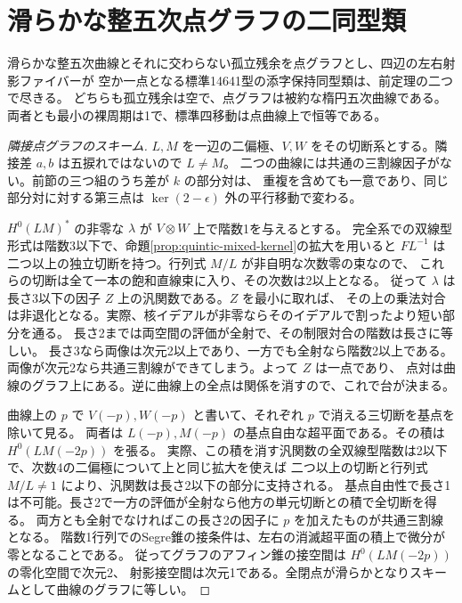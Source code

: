 \section{滑らかな整五次点グラフの二同型類}
\label{sec:elliptic-quintic-regularity}
\begin{theorem}\label{thm:elliptic-quintic-regularity}
滑らかな整五次曲線とそれに交わらない孤立残余を点グラフとし、四辺の左右射影ファイバーが
空か一点となる標準14641型の添字保持同型類は、前定理の二つで尽きる。
どちらも孤立残余は空で、点グラフは被約な楕円五次曲線である。
両者とも最小の裸周期は1で、標準四移動は点曲線上で恒等である。
\end{theorem}
\begin{proof}[隣接点グラフのスキーム]
$L,M$ を一辺の二偏極、$V,W$ をその切断系とする。隣接差 $a,b$ は五捩れではないので $L\ne M$。
二つの曲線には共通の三割線因子がない。前節の三つ組のうち差が $k$ の部分対は、
重複を含めても一意であり、同じ部分対に対する第三点は $\ker(2-\epsilon)$ 外の平行移動で変わる。

$H^0(LM)^*$ の非零な $\lambda$ が $V\otimes W$ 上で階数1を与えるとする。
完全系での双線型形式は階数3以下で、命題\ref{prop:quintic-mixed-kernel}の拡大を用いると
$F L^{-1}$ は二つ以上の独立切断を持つ。行列式 $M/L$ が非自明な次数零の束なので、
これらの切断は全て一本の飽和直線束に入り、その次数は2以上となる。
従って $\lambda$ は長さ3以下の因子 $Z$ 上の汎関数である。$Z$ を最小に取れば、
その上の乗法対合は非退化となる。実際、核イデアルが非零ならそのイデアルで割ったより短い部分を通る。
長さ2までは両空間の評価が全射で、その制限対合の階数は長さに等しい。
長さ3なら両像は次元2以上であり、一方でも全射なら階数2以上である。
両像が次元2なら共通三割線ができてしまう。よって $Z$ は一点であり、
点対は曲線のグラフ上にある。逆に曲線上の全点は関係を消すので、これで台が決まる。

曲線上の $p$ で $V(-p), W(-p)$ と書いて、それぞれ $p$ で消える三切断を基点を除いて見る。
両者は $L(-p),M(-p)$ の基点自由な超平面である。その積は $H^0(LM(-2p))$ を張る。
実際、この積を消す汎関数の全双線型階数は2以下で、次数4の二偏極について上と同じ拡大を使えば
二つ以上の切断と行列式 $M/L\ne1$ により、汎関数は長さ2以下の部分に支持される。
基点自由性で長さ1は不可能。長さ2で一方の評価が全射なら他方の単元切断との積で全切断を得る。
両方とも全射でなければこの長さ2の因子に $p$ を加えたものが共通三割線となる。
階数1行列でのSegre錐の接条件は、左右の消滅超平面の積上で微分が零となることである。
従ってグラフのアフィン錐の接空間は $H^0(LM(-2p))$ の零化空間で次元2、
射影接空間は次元1である。全閉点が滑らかとなりスキームとして曲線のグラフに等しい。


\end{proof}
